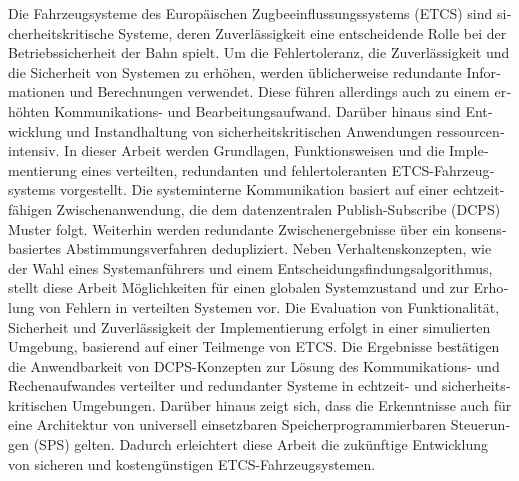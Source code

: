 \null\vfil
\begin{otherlanguage}{ngerman}
\begin{center}\textsf{\textbf{\abstractname}}\end{center}

\noindent 

Die Fahrzeugsysteme des Europäischen Zugbeeinflussungssystems (ETCS) sind sicherheitskritische Systeme, deren Zuverlässigkeit eine entscheidende Rolle bei der Betriebssicherheit der Bahn spielt.
Um die Fehlertoleranz, die Zuverlässigkeit und die Sicherheit von Systemen zu erhöhen, werden üblicherweise redundante Informationen und Berechnungen verwendet.
Diese führen allerdings auch zu einem erhöhten Kommunikations- und Bearbeitungsaufwand.
Darüber hinaus sind Entwicklung und Instandhaltung von sicherheitskritischen Anwendungen ressourcenintensiv.
In dieser Arbeit werden Grundlagen, Funktionsweisen und die Implementierung eines verteilten, redundanten und fehlertoleranten ETCS-Fahrzeugsystems vorgestellt.
Die systeminterne Kommunikation basiert auf einer echtzeitfähigen Zwischenanwendung, die dem datenzentralen Publish-Subscribe (DCPS) Muster folgt.
Weiterhin werden redundante Zwischenergebnisse über ein konsensbasiertes Abstimmungsverfahren dedupliziert.
Neben Verhaltenskonzepten, wie der Wahl eines Systemanführers und einem Entscheidungsfindungsalgorithmus, stellt diese Arbeit Möglichkeiten für einen globalen Systemzustand und zur Erholung von Fehlern in verteilten Systemen vor.
Die Evaluation von Funktionalität, Sicherheit und Zuverlässigkeit der Implementierung erfolgt in einer simulierten Umgebung, basierend auf einer Teilmenge von ETCS.
Die Ergebnisse bestätigen die Anwendbarkeit von DCPS-Konzepten zur Lösung des Kommunikations- und Rechenaufwandes verteilter und redundanter Systeme in echtzeit- und sicherheitskritischen Umgebungen.
Darüber hinaus zeigt sich, dass die Erkenntnisse auch für eine Architektur von universell einsetzbaren Speicherprogrammierbaren Steuerungen (SPS) gelten. 
Dadurch erleichtert diese Arbeit die zukünftige Entwicklung von sicheren und kostengünstigen ETCS-Fahrzeugsystemen.

\end{otherlanguage}
\vfil\null


